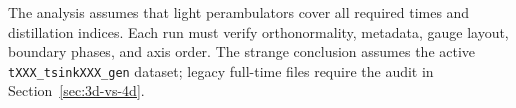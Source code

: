 \documentclass[11pt]{article}
\numberwithin{equation}{section}
\begin{document}
The analysis assumes that light perambulators cover all required times and
distillation indices. Each run must verify orthonormality, metadata, gauge
layout, boundary phases, and axis order. The strange conclusion assumes the
active \texttt{tXXX\_tsinkXXX\_gen} dataset; legacy full-time files require
the audit in Section~\ref{sec:3d-vs-4d}.

\begingroup
\small


\endgroup
\end{document}
